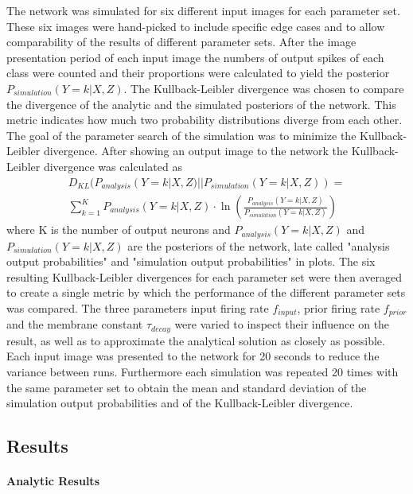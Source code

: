 The network was simulated for six different input images for each parameter set. These six images were hand-picked to include specific edge cases and to allow comparability of the results of different parameter sets. After the image presentation period of each input image the numbers of output spikes of each class were counted and their proportions were calculated to yield the posterior $P_{simulation}(Y = k|X, Z)$. The Kullback-Leibler divergence was chosen to compare the divergence of the analytic and the simulated posteriors of the network. This metric indicates how much two probability distributions diverge from each other. The goal of the parameter search of the simulation was to minimize the Kullback-Leibler divergence. After showing an output image to the network the Kullback-Leibler divergence was calculated as
\begin{equation}
\begin{split}
\label{eqn:KLDivergence}
D_{KL}(P_{analysis}(Y = k|X, Z)||P_{simulation}(Y = k|X, Z)) = \\ \sum_{k=1}^K P_{analysis}(Y = k|X, Z) \cdot \ln( \frac{P_{analysis}(Y = k|X, Z)}{P_{simulation}(Y = k|X, Z)})
\end{split}
\end{equation}
where K is the number of output neurons and $P_{analysis}(Y = k|X, Z)$ and $P_{simulation}(Y = k|X, Z)$ are the posteriors of the network, late called "analysis output probabilities" and "simulation output probabilities" in plots. The six resulting Kullback-Leibler divergences for each parameter set were then averaged to create a single metric by which the performance of the different parameter sets was compared. The three parameters input firing rate $f_{input}$, prior firing rate $f_{prior}$ and the membrane constant $\tau_{decay}$ were varied to inspect their influence on the result, as well as to approximate the analytical solution as closely as possible. Each input image was presented to the network for 20 seconds to reduce the variance between runs. Furthermore each simulation was repeated 20 times with the same parameter set to obtain the mean and standard deviation of the simulation output probabilities and of the Kullback-Leibler divergence.

\subsection{Results}

\paragraph{Analytic Results}

